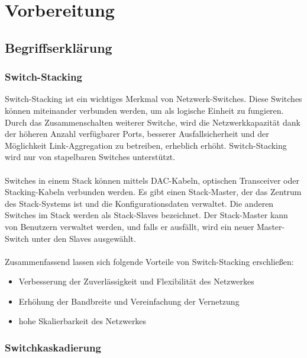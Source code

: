\section{Vorbereitung}

    \subsection{Begriffserklärung}

        \subsubsection{Switch-Stacking}

        Switch-Stacking ist ein wichtiges Merkmal von Netzwerk-Switches.
        Diese Switches können miteinander verbunden werden, um als 
        logische Einheit zu fungieren. Durch das Zusammenschalten weiterer Switche, wird die Netzwerkkapazität 
        dank der höheren Anzahl verfügbarer Ports, besserer Ausfallsicherheit und der Möglichkeit 
        Link-Aggregation zu betreiben, erheblich erhöht. 
        Switch-Stacking wird nur von stapelbaren Switches unterstützt. \\\\
        Switches in einem Stack können mittels DAC-Kabeln, optischen Transceiver oder Stacking-Kabeln verbunden werden. 
        Es gibt einen Stack-Master, der das Zentrum des Stack-Systems ist und die Konfigurationsdaten verwaltet. 
        Die anderen Switches im Stack werden als Stack-Slaves bezeichnet. 
        Der Stack-Master kann von Benutzern verwaltet werden, und falls er ausfällt, wird ein neuer Master-Switch unter den Slaves ausgewählt.\\\\
        Zusammenfassend lassen sich folgende Vorteile von Switch-Stacking erschließen:
        \begin{itemize}
            \item Verbesserung der Zuverlässigkeit und Flexibilität des Netzwerkes
            \item Erhöhung der Bandbreite und Vereinfachung der Vernetzung
            \item hohe Skalierbarkeit des Netzwerkes
        \end{itemize}

        \subsubsection{Switchkaskadierung}

